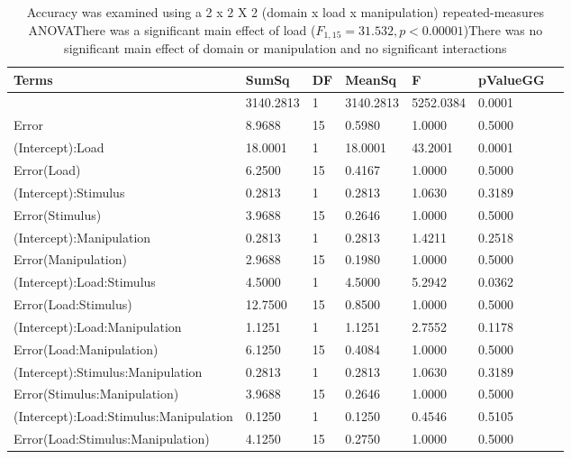 \begin{table}
\centering
\begin{tabular}[0.2em]{@{}lllllll@{}}\toprule
Terms & SumSq & DF & MeanSq & F & pValueGG\\\toprule[0.2em]
(Intercept) & 3140.2813 & 1 & 3140.2813 & 5252.0384 & 0.0001 \\\midrule
Error & 8.9688 & 15 & 0.5980 & 1.0000 & 0.5000 \\\midrule
(Intercept):Load & 18.0001 & 1 & 18.0001 & 43.2001 & 0.0001 \\\midrule
Error(Load) & 6.2500 & 15 & 0.4167 & 1.0000 & 0.5000 \\\midrule
(Intercept):Stimulus & 0.2813 & 1 & 0.2813 & 1.0630 & 0.3189 \\\midrule
Error(Stimulus) & 3.9688 & 15 & 0.2646 & 1.0000 & 0.5000 \\\midrule
(Intercept):Manipulation & 0.2813 & 1 & 0.2813 & 1.4211 & 0.2518 \\\midrule
Error(Manipulation) & 2.9688 & 15 & 0.1980 & 1.0000 & 0.5000 \\\midrule
(Intercept):Load:Stimulus & 4.5000 & 1 & 4.5000 & 5.2942 & 0.0362 \\\midrule
Error(Load:Stimulus) & 12.7500 & 15 & 0.8500 & 1.0000 & 0.5000 \\\midrule
(Intercept):Load:Manipulation & 1.1251 & 1 & 1.1251 & 2.7552 & 0.1178 \\\midrule
Error(Load:Manipulation) & 6.1250 & 15 & 0.4084 & 1.0000 & 0.5000 \\\midrule
(Intercept):Stimulus:Manipulation & 0.2813 & 1 & 0.2813 & 1.0630 & 0.3189 \\\midrule
Error(Stimulus:Manipulation) & 3.9688 & 15 & 0.2646 & 1.0000 & 0.5000 \\\midrule
(Intercept):Load:Stimulus:Manipulation & 0.1250 & 1 & 0.1250 & 0.4546 & 0.5105 \\\midrule
Error(Load:Stimulus:Manipulation) & 4.1250 & 15 & 0.2750 & 1.0000 & 0.5000 \\\bottomrule[0.2em]
\end{tabular}
\caption{Accuracy was examined using a 2 x 2 X 2 (domain x load x manipulation) repeated-measures ANOVAThere was a significant main effect of load ($F_{1,15}=31.532, p<0.00001$)There was no significant main effect of domain or manipulation and no significant interactions\label{tabel:behStudy2Acc}}
\end{table}
